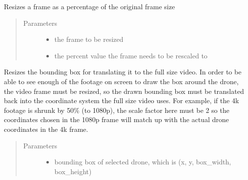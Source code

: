 \documentclass[letterpaper,10pt,english]{sphinxmanual}
\begin{document}
\begin{fulllineitems}
\begin{fulllineitems}
\end{fulllineitems}


\begin{fulllineitems}
\label{\detokenize{index:src.Controllers.OpenCVThreadedController.DroneTracker.rescale_frame}}
Resizes a frame as a percentage of the original frame size
\begin{quote}\begin{description}
\item[{Parameters}] \leavevmode\begin{itemize}
\item {} 
 \textendash{} the frame to be resized

\item {} 
 \textendash{} the percent value the frame needs to be rescaled to

\end{itemize}

\end{description}\end{quote}

\end{fulllineitems}


\begin{fulllineitems}
\label{\detokenize{index:src.Controllers.OpenCVThreadedController.DroneTracker.resize_bbox}}
Resizes the bounding box for translating it to the full size video.
In order to be able to see enough of the footage on screen to draw the box around the drone,
the video frame must be resized, so the drawn bounding box must be translated back into the
coordinate system the full size video uses.
For example, if the 4k footage is shrunk by 50\% (to 1080p), the scale factor here must be 2
so the coordinates chosen in the 1080p frame will match up with the actual drone coordinates in the 4k frame.
\begin{quote}\begin{description}
\item[{Parameters}] \leavevmode\begin{itemize}
\item {} 
 \textendash{} bounding box of selected drone, which is (x, y, box\_width, box\_height)


\end{itemize}
\end{description}
\end{quote}
\end{fulllineitems}
\end{fulllineitems}
\end{document}
